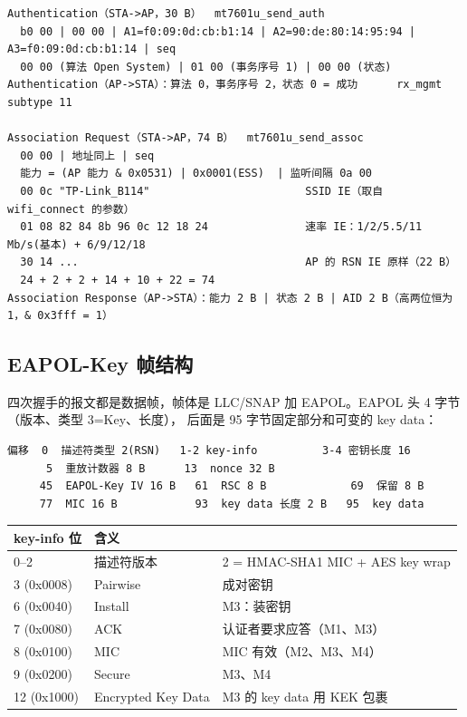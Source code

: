 \begin{lstlisting}
Authentication（STA->AP，30 B）  mt7601u_send_auth
  b0 00 | 00 00 | A1=f0:09:0d:cb:b1:14 | A2=90:de:80:14:95:94 | A3=f0:09:0d:cb:b1:14 | seq
  00 00 (算法 Open System) | 01 00 (事务序号 1) | 00 00 (状态)
Authentication（AP->STA）：算法 0，事务序号 2，状态 0 = 成功      rx_mgmt subtype 11

Association Request（STA->AP，74 B）  mt7601u_send_assoc
  00 00 | 地址同上 | seq
  能力 = (AP 能力 & 0x0531) | 0x0001(ESS)  | 监听间隔 0a 00
  00 0c "TP-Link_B114"                        SSID IE（取自 wifi_connect 的参数）
  01 08 82 84 8b 96 0c 12 18 24               速率 IE：1/2/5.5/11 Mb/s(基本) + 6/9/12/18
  30 14 ...                                   AP 的 RSN IE 原样（22 B）
  24 + 2 + 2 + 14 + 10 + 22 = 74
Association Response（AP->STA）：能力 2 B | 状态 2 B | AID 2 B（高两位恒为 1，& 0x3fff = 1）
\end{lstlisting}

\subsection{EAPOL-Key 帧结构}

四次握手的报文都是数据帧，帧体是 LLC/SNAP  加 EAPOL。EAPOL 头 4 字节（版本、类型 3=Key、长度），
后面是 95 字节固定部分和可变的 key data：

\begin{lstlisting}
偏移  0  描述符类型 2(RSN)   1-2 key-info          3-4 密钥长度 16
      5  重放计数器 8 B      13  nonce 32 B
     45  EAPOL-Key IV 16 B   61  RSC 8 B             69  保留 8 B
     77  MIC 16 B            93  key data 长度 2 B   95  key data
\end{lstlisting}

\begingroup\small\begin{longtable}{p{16mm}p{36mm}p{81mm}}
\toprule
key-info 位 & 含义 & \\ \midrule \endhead
0--2 & 描述符版本 & 2 = HMAC-SHA1 MIC + AES key wrap \\
3 (0x0008) & Pairwise & 成对密钥 \\
6 (0x0040) & Install & M3：装密钥 \\
7 (0x0080) & ACK & 认证者要求应答（M1、M3） \\
8 (0x0100) & MIC & MIC 有效（M2、M3、M4） \\
9 (0x0200) & Secure & M3、M4 \\
12 (0x1000) & Encrypted Key Data & M3 的 key data 用 KEK 包裹 \\
\bottomrule
\end{longtable}\endgroup

